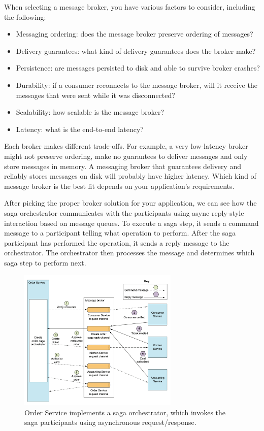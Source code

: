 \documentclass[conference]{IEEEtran}
\begin{document}
When selecting a message broker, you have various factors to consider, including the following:

\begin{itemize}
  \item Messaging ordering: does the message broker preserve ordering of messages?
  \item Delivery guarantees: what kind of delivery guarantees does the broker make?
  \item Persistence: are messages persisted to disk and able to survive broker crashes?
  \item Durability: if a consumer reconnects to the message broker, will it receive the messages that were sent while it was disconnected?
  \item Scalability: how scalable is the message broker?
  \item Latency: what is the end-to-end latency?
\end{itemize}

Each broker makes different trade-offs. For example, a very low-latency broker might not preserve ordering, make no guarantees to deliver messages and only store messages in memory. A messaging broker that guarantees delivery and reliably stores messages on disk will probably have higher latency. Which kind of message broker is the best fit depends on your application’s requirements. \cite{microservices-patterns-broker}

After picking the proper broker solution for your application, we can see how the saga orchestrator communicates with the participants using async reply-style interaction based on message queues. To execute a saga step, it sends a command message to a participant telling what operation to perform. After the saga participant has performed the operation, it sends a reply message to the orchestrator. The orchestrator then processes the message and determines which saga step to perform next.

\begin{figure}[!htbp]
\centering
\includegraphics[width=3in]{jpeg/orchestrator-saga}
\caption{Order Service implements a saga orchestrator, which invokes the saga participants using asynchronous request/response. \cite{microservices-patterns-saga}}
\label{orchestrator_saga}
\end{figure}
\end{document}
